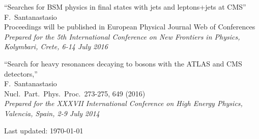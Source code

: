 \documentclass[10pt, a4paper]{article}
\begin{document}
\begin{thebibliography}{599}
  ``Searches for BSM physics in ﬁnal states with jets and leptons+jets at CMS''
  \\{}F.~Santanastasio
   \\{} Proceedings will be published in European Physical Journal Web of Conferences
  \\{}{\it Prepared for the 5th International Conference on New
    Frontiers in Physics, Kolymbari, Crete, 6-14 July 2016} 

``Search for heavy resonances decaying to bosons with the ATLAS and CMS detectors,'' 
 \\{}F.~Santanastasio 
 \\ Nucl.\ Part.\ Phys.\ Proc.\  273-275, 649 (2016)
  \\{}{\it Prepared for the XXXVII International Conference on High Energy Physics, Valencia, Spain, 2-9 July 2014}





\end{thebibliography}

\vfill{}
\hrulefill

\begin{center}
{\footnotesize Last updated: \today}
\end{center}
\end{document}

